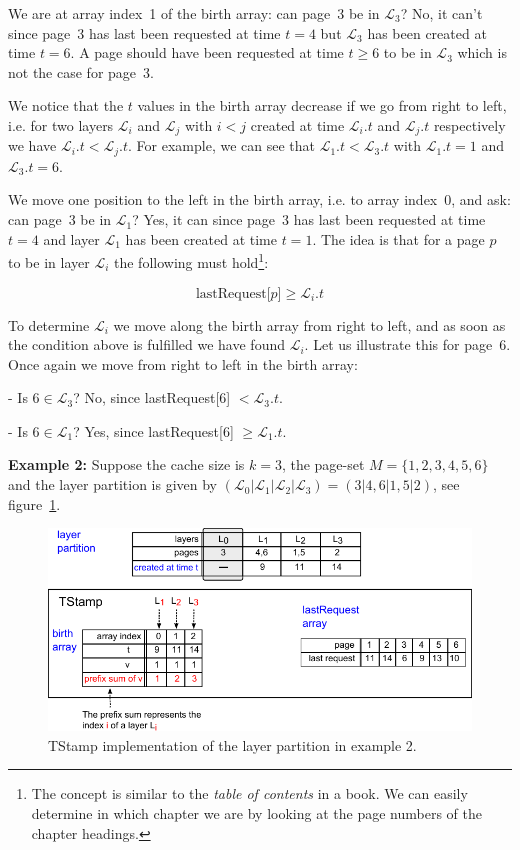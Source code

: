 \documentclass[a4paper,12pt, titlepage]{article}  %
\newcommand{\cl}{\mathcal{L}}   %
\begin{document}
We are at array index~1 of the birth array: can page~3 be in $\cl_3$? No, it can't since page~3 has last been requested
at time $t=4$ but $\cl_3$ has been
created at time $t=6$. A page should have been requested at time $t \geq 6$ to be in $\cl_3$ which is not the case
for page~3.

We notice that the $t$ values in the birth array decrease if we go from right to left, i.e. for two layers
$\cl_i$ and $\cl_j$ with $i<j$ created at time $\cl_i.t$ and $\cl_j.t$ respectively we have $\cl_i.t < \cl_j.t$.
For example, we can see that $\cl_1.t < \cl_3.t$ with $\cl_1.t=1$ and $\cl_3.t=6$. 

We move one position to the left in the birth array, i.e. to array index~0, and ask: 
can page~3 be in $\cl_1$? Yes, it can since page~3 has last been requested at time $t=4$ and layer $\cl_1$ has been 
created at time $t=1$. The idea is that for a page $p$ to be in layer $\cl_i$ the following must hold\footnote{The concept 
is similar to the \emph{table of contents} in a book. 
We can easily determine in which chapter we are by looking at the page numbers of the chapter headings.}:

\[
\text{lastRequest[$p$]} \geq \cl_i.t
\]

\noindent To determine $\cl_i$ we move along the birth array from right to left, and as soon
as the condition above is fulfilled we have found $\cl_i$. 
Let us illustrate this for page~6. Once again we move from right to left in the birth array:

- Is $6 \in \cl_3$? No, since lastRequest[6] $< \cl_3.t$. 

- Is $6 \in \cl_1$? Yes, since lastRequest[6] $\geq \cl_1.t$.


\newpage
\noindent \textbf{Example 2:} Suppose the cache size is $k=3$, the page-set $M=\{1,2,3,4,5,6\}$ 
and the layer partition is given by $( \cl_0 | \cl_1 | \cl_2 | \cl_3) = (3 | 4,6 | 1,5 | 2)$, see figure~\ref{fig:TStamp_prefixSum2}.

\begin{figure}[htp]
	\centering
	\includegraphics[scale=1.0]{./figures/TStamp_prefixSum2.pdf}
	\caption{TStamp implementation of the layer partition in example 2.} 
	\label{fig:TStamp_prefixSum2}
\end{figure}
\end{document}
